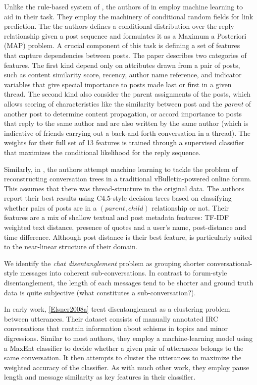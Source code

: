 \documentclass{article}
\begin{document}
Unlike the rule-based system of \cite{Wang2008a}, the authors of 
in \cite{Wang2011a} employ machine learning to aid in their task. They employ
the machinery of conditional random fields for link prediction.
The the authors defines a conditional distribution over the reply
relationship given a post sequence and formulates it as a Maximum a Posteriori
(MAP) problem. A crucial component of this task is defining a set of features
that capture dependencies between posts. The paper describes two categories of
features. The first kind depend only on attributes drawn from a pair
of posts, such as content similarity score, recency, author name reference, and
indicator variables that give special importance to posts made last or first in
a given thread. The second kind also consider the parent assignments of
the posts, which allows scoring of characteristics like the
similarity between  post and the \emph{parent} of another post to determine
content propagation, or accord importance to posts that reply to the same author
and are also written by the same author (which is indicative of friends carrying
out a back-and-forth conversation in a thread). The weights for their full set of
13 features is trained through a supervised classifier that maximizes the
conditional likelihood for the reply sequence.

Similarly, in \cite{Aumayr2011a}, the authors attempt machine learning to 
tackle the problem of reconstructing conversation trees in a traditional
vBulletin-powered online forum. This assumes that there was thread-structure 
in the original data. The authors report their best results using C4.5-style
decision trees based on classifying whether pairs of posts are in a $(parent, child)$
relationship or not. Their features are a mix of shallow textual and post 
metadata features: TF-IDF weighted text distance, 
presence of quotes and a user's name, post-distance and time difference. 
Although post distance is their best feature, is particularly suited to the 
near-linear structure of their domain.

We identify the \textit{chat disentanglement} problem as grouping
shorter conversational-style messages into coherent sub-conversations.
In contrast to forum-style disentanglement, the length of each messages tend to be shorter
and ground truth data is quite subjective (what constitutes a sub-conversation?).

In early work, \ref{Elsner2008a} treat disentanglement as a clustering problem between 
utterances. Their dataset consists of manually annotated IRC conversations that contain
information about schisms in topics and minor digressions. Similar to most authors, 
they employ a machine-learning model using a MaxEnt classifier to decide whether a given pair of
utterances belongs to the same conversation. It then attempts to cluster the
utterances to maximize the weighted accuracy of the classifier. As with much other
work, they employ pause length and message similarity as key features in
their classifier.
\end{document}

